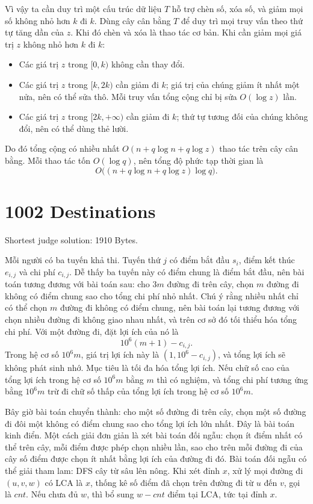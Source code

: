 \documentclass[11pt]{article}
\begin{document}
Vì vậy ta cần duy trì một cấu trúc dữ liệu $T$ hỗ trợ chèn số, xóa số, và
giảm mọi số không nhỏ hơn $k$ đi $k$. Dùng cây cân bằng $T$ để duy trì mọi
truy vấn theo thứ tự tăng dần của $z$. Khi đó chèn và xóa là thao tác cơ bản.
Khi cần giảm mọi giá trị $z$ không nhỏ hơn $k$ đi $k$:

\begin{itemize}
  \item Các giá trị $z$ trong $[0,k)$ không cần thay đổi.
  \item Các giá trị $z$ trong $[k,2k)$ cần giảm đi $k$; giá trị của chúng
  giảm ít nhất một nửa, nên có thể sửa thô. Mỗi truy vấn tổng cộng chỉ bị sửa
  $O(\log z)$ lần.
  \item Các giá trị $z$ trong $[2k,+\infty)$ cần giảm đi $k$; thứ tự tương
  đối của chúng không đổi, nên có thể dùng thẻ lười.
\end{itemize}

Do đó tổng cộng có nhiều nhất $O(n+q\log n+q\log z)$ thao tác trên cây cân
bằng. Mỗi thao tác tốn $O(\log q)$, nên tổng độ phức tạp thời gian là
\[
  O\bigl((n+q\log n+q\log z)\log q\bigr).
\]

\section{1002 Destinations}

Shortest judge solution: 1910 Bytes.

Mỗi người có ba tuyến khả thi. Tuyến thứ $j$ có điểm bắt đầu $s_i$, điểm kết
thúc $e_{i,j}$ và chi phí $c_{i,j}$. Dễ thấy ba tuyến này có điểm chung là
điểm bắt đầu, nên bài toán tương đương với bài toán sau: cho $3m$ đường đi
trên cây, chọn $m$ đường đi không có điểm chung sao cho tổng chi phí nhỏ nhất.
Chú ý rằng nhiều nhất chỉ có thể chọn $m$ đường đi không có điểm chung, nên
bài toán lại tương đương với chọn nhiều đường đi không giao nhau nhất, và trên
cơ sở đó tối thiểu hóa tổng chi phí. Với một đường đi, đặt lợi ích của nó là
\[
  10^6(m+1)-c_{i,j}.
\]
Trong hệ cơ số $10^6m$, giá trị lợi ích này là $(1,10^6-c_{i,j})$, và tổng
lợi ích sẽ không phát sinh nhớ. Mục tiêu là tối đa hóa tổng lợi ích. Nếu chữ
số cao của tổng lợi ích trong hệ cơ số $10^6m$ bằng $m$ thì có nghiệm, và
tổng chi phí tương ứng bằng $10^6m$ trừ đi chữ số thấp của tổng lợi ích trong
hệ cơ số $10^6m$.

Bây giờ bài toán chuyển thành: cho một số đường đi trên cây, chọn một số
đường đi đôi một không có điểm chung sao cho tổng lợi ích lớn nhất. Đây là
bài toán kinh điển. Một cách giải đơn giản là xét bài toán đối ngẫu: chọn ít
điểm nhất có thể trên cây, mỗi điểm được phép chọn nhiều lần, sao cho trên
mỗi đường đi của cây số điểm được chọn ít nhất bằng lợi ích của đường đi đó.
Bài toán đối ngẫu có thể giải tham lam: DFS cây từ sâu lên nông. Khi xét
đỉnh $x$, xử lý mọi đường đi $(u,v,w)$ có LCA là $x$, thống kê số điểm đã
chọn trên đường đi từ $u$ đến $v$, gọi là $\mathit{cnt}$. Nếu chưa đủ $w$,
thì bổ sung $w-\mathit{cnt}$ điểm tại LCA, tức tại đỉnh $x$.
\end{document}
